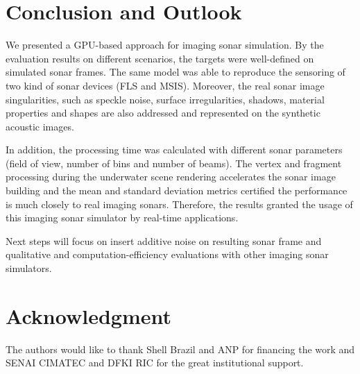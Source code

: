 \documentclass[final,5p,times]{elsarticle}
\begin{document}

\section{Conclusion and Outlook}
\label{conclusion}

We presented a GPU-based approach for imaging sonar simulation. By the evaluation results on different scenarios, the targets were well-defined on simulated sonar frames. The same model was able to reproduce the sensoring of two kind of sonar devices (FLS and MSIS). Moreover, the real sonar image singularities, such as speckle noise, surface irregularities, shadows, material properties and shapes are also addressed and represented on the synthetic acoustic images.

In addition, the processing time was calculated with different sonar parameters (field of view, number of bins and number of beams). The vertex and fragment processing during the underwater scene rendering accelerates the sonar image building and the mean and standard deviation metrics certified the performance is much closely to real imaging sonars. Therefore, the results granted the usage of this imaging sonar simulator by real-time applications.

Next steps will focus on insert additive noise on resulting sonar frame and qualitative and computation-efficiency evaluations with other imaging sonar simulators.




\section*{Acknowledgment}
%
The authors would like to thank Shell Brazil and ANP for financing the work and SENAI CIMATEC and DFKI RIC for the great institutional support.
\end{document}

